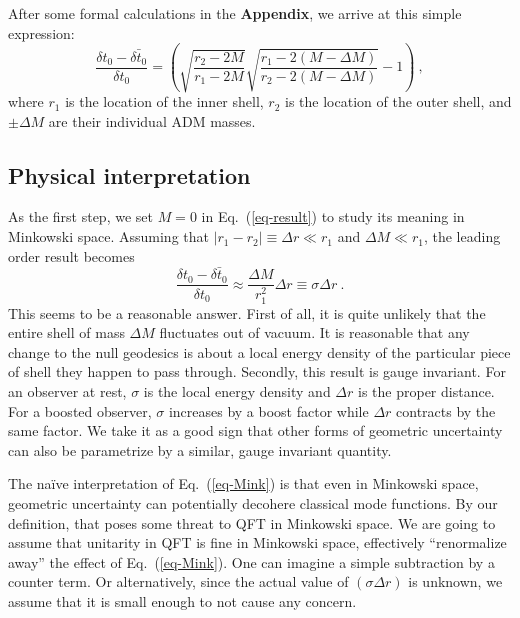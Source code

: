 \documentclass[aps,showpacs,twocolumn,floats,prd,superscriptaddress,nofootinbib]{revtex4-1}
\begin{document}
After some formal calculations in the {\bf Appendix}, we arrive at this simple expression:
\begin{equation}
\frac{\delta t_0 - \bar{\delta t_0}}{\delta t_0} = 
\left(\sqrt{\frac{r_2-2M}{r_1-2M}}\sqrt{\frac{r_1-2(M-\Delta M)}{r_2-2(M-\Delta M)}}-1\right)~,
\label{eq-result}
\end{equation}
where $r_1$ is the location of the inner shell, $r_2$ is the location of the outer shell, and $\pm\Delta M$ are their individual ADM masses.

\subsection{Physical interpretation}

As the first step, we set $M=0$ in Eq.~(\ref{eq-result}) to study its meaning in Minkowski space. Assuming that $|r_1-r_2| \equiv \Delta r \ll r_1$ and $\Delta M \ll r_1$, the leading order result becomes
\begin{equation}
\frac{\delta t_0 - \bar{\delta t_0}}{\delta t_0} \approx \frac{\Delta M}{r_1^2} \Delta r 
\equiv \sigma \Delta r~.
\label{eq-Mink}
\end{equation}
This seems to be a reasonable answer. 
First of all, it is quite unlikely that the entire shell of mass $\Delta M$ fluctuates out of vacuum.
It is reasonable that any change to the null geodesics is about a local energy density of the particular piece of shell they happen to pass through.
Secondly, this result is gauge invariant. For an observer at rest, $\sigma$ is the local energy density and $\Delta r$ is the proper distance. 
For a boosted observer, $\sigma$ increases by a boost factor while $\Delta r$ contracts by the same factor.
We take it as a good sign that other forms of geometric uncertainty can also be parametrize by a similar, gauge invariant quantity.

The na\"ive interpretation of Eq.~(\ref{eq-Mink}) is that even in Minkowski space, geometric uncertainty can potentially decohere classical mode functions.
By our definition, that poses some threat to QFT in Minkowski space.
We are going to assume that unitarity in QFT is fine in Minkowski space, effectively ``renormalize away'' the effect of Eq.~(\ref{eq-Mink}).
One can imagine a simple subtraction by a counter term.
Or alternatively, since the actual value of $(\sigma\Delta r)$ is unknown, we assume that it is small enough to not cause any concern.
\end{document}
